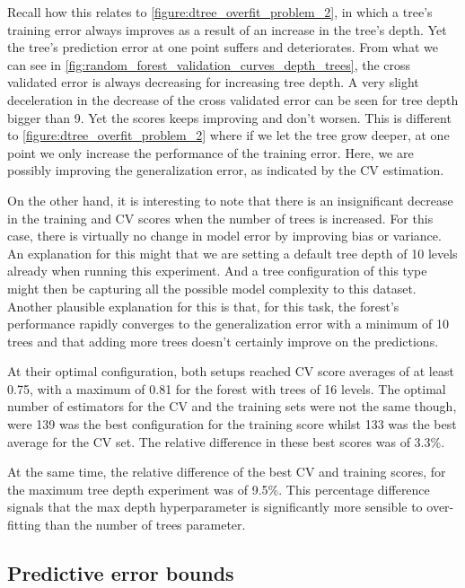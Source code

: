 Recall how this relates to \cref{figure:dtree_overfit_problem_2}, in which a tree's training error always improves as a result of an increase in the tree's depth.
Yet the tree's prediction error at one point suffers and deteriorates.
From what we can see in \cref{fig:random_forest_validation_curves_depth_trees}, the cross validated error is always decreasing for increasing tree depth.
A very slight deceleration in the decrease of the cross validated error can be seen for tree depth bigger than 9.
Yet the scores keeps improving and don't worsen.
This is different to \cref{figure:dtree_overfit_problem_2} where if we let the tree grow deeper, at one point we only increase the performance of the training error.
Here, we are possibly improving the generalization error, as indicated by the CV estimation.

 On the other hand, it is interesting to note that there is an insignificant decrease in the training and CV scores when the number of trees is increased.
For this case, there is virtually no change in model error by improving bias or variance.
 An explanation for this might that we are setting a default tree depth of 10 levels already when running this experiment. And a tree configuration of this type might then be capturing all the possible model complexity to this dataset.
 Another plausible explanation for this is that, for this task, the forest's performance rapidly converges to the generalization error with a minimum of 10 trees and that adding more trees doesn't certainly improve on the predictions.


At their optimal configuration, both setups reached CV score averages of at least 0.75, with a maximum of 0.81 for the forest
with trees of 16 levels.
The optimal number of estimators for the CV and the training sets were not the same though, were 139 was the best configuration for the training score whilst 133 was the best average for the CV set.
The relative difference in these best scores was of 3.3\%.

At the same time, the relative difference of the best CV and training scores, for the maximum tree depth experiment was of 9.5\%.
This percentage difference signals that the max depth hyperparameter is significantly more sensible to over-fitting than the number of trees parameter.


\subsection{Predictive error bounds}\label{subsec:rforest_predictive_error_bounds}

